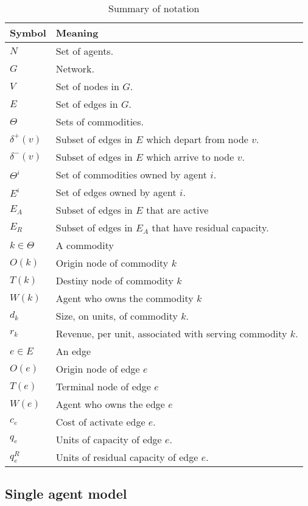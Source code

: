 \documentclass[authoryear]{elsarticle}
\begin{document}
\begin{table}[ht!]
	\caption{Summary of notation \label{tb:notation}}
	\begin{tabular}{|l|l|}
	\hline
	Symbol & Meaning	 \\ \hline
	$N$ & Set of agents. \\
	$G$ & Network. \\
	$V$ & Set of nodes in $G$. \\
	$E$ & Set of edges in $G$. \\
	$\Theta$ & Sets of commodities. \\
	$\delta^+(v)$ & Subset of edges in $E$ which depart from node $v$.\\
	$\delta^-(v)$ & Subset of edges in $E$ which arrive to node $v$.\\	
	$\Theta^i$ & Set of commodities owned by agent $i$. \\	
	$E^i$ & Set of edges owned by agent $i$.\\
	$E_A$ & Subset of edges in $E$ that are active \\
	$E_R$ & Subset of edges in $E_A$ that have residual capacity.\\
	$k \in \Theta$ & A commodity\\
	$O(k)$ & Origin node of commodity $k$\\
	$T(k)$ & Destiny node of commodity $k$\\
	$W(k)$ & Agent who owns the commodity $k$\\
	$d_k$ & Size, on units, of commodity $k$.\\
	$r_k$ & Revenue, per unit, associated with serving commodity $k$.\\
	$e\in E$ & An edge\\
	$O(e)$ & Origin node of edge $e$\\
	$T(e)$ & Terminal node of edge $e$\\
	$W(e)$ & Agent who owns the edge $e$\\
	$c_e$ & Cost of activate edge $e$. \\
	$q_e$ & Units of capacity of edge $e$. \\
	$q_e^R$ & Units of residual capacity of edge $e$.\\
	\hline
	\end{tabular}
\end{table}

\subsection{Single agent model}
\end{document}
